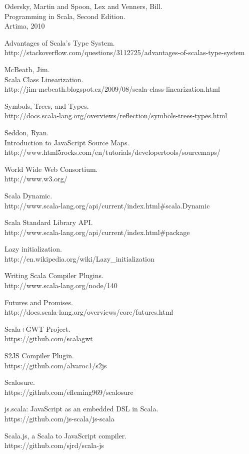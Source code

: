 \begin{thebibliography}{99}
	{\sc Odersky,} Martin and {\sc Spoon,} Lex and {\sc Venners,} Bill.\\  Programming in Scala, Second Edition.\\
	Artima, 2010
	
	Advantages of Scala's Type System.\\
	http://stackoverflow.com/questions/3112725/advantages-of-scalas-type-system
	
  {\sc McBeath}, Jim.\\
	Scala Class Linearization.\\
	http://jim-mcbeath.blogspot.cz/2009/08/scala-class-linearization.html
	
	Symbols, Trees, and Types.\\
	http://docs.scala-lang.org/overviews/reflection/symbols-trees-types.html
	
  {\sc Seddon,} Ryan.\\
	Introduction to JavaScript Source Maps.\\
  http://www.html5rocks.com/en/tutorials/developertools/sourcemaps/
	
  World Wide Web Consortium.\\
	http://www.w3.org/
	
  Scala Dynamic.\\
	http://www.scala-lang.org/api/current/index.html\#scala.Dynamic
	
	Scala Standard Library API.\\
  http://www.scala-lang.org/api/current/index.html\#package
	
  Lazy initialization.\\
	http://en.wikipedia.org/wiki/Lazy\_initialization
	
  Writing Scala Compiler Plugins.\\
  http://www.scala-lang.org/node/140
	
  Futures and Promises.\\
  http://docs.scala-lang.org/overviews/core/futures.html
	
  Scala+GWT Project.\\
  https://github.com/scalagwt
	
  S2JS Compiler Plugin.\\
  https://github.com/alvaroc1/s2js
	
  Scalosure.\\
  https://github.com/efleming969/scalosure
	
  js.scala: JavaScript as an embedded DSL in Scala.\\
  https://github.com/js-scala/js-scala
	
  Scala.js, a Scala to JavaScript compiler.\\
  https://github.com/sjrd/scala-js
		
\end{thebibliography}